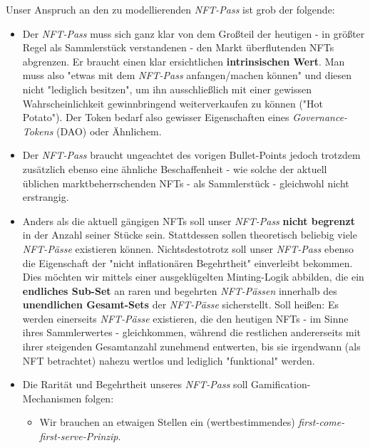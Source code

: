
Unser Anspruch an den zu modellierenden \textit{NFT-Pass} ist grob der folgende:

\vspace{0.2cm}

\begin{itemize}
  \item Der \textit{NFT-Pass} muss sich ganz klar von dem Großteil der heutigen - in größter Regel als Sammlerstück verstandenen - den Markt überflutenden NFTs abgrenzen. Er braucht einen klar ersichtlichen \textbf{intrinsischen Wert}. Man muss also "etwas mit dem \textit{NFT-Pass} anfangen/machen können" und diesen nicht "lediglich besitzen", um ihn ausschließlich mit einer gewissen Wahrscheinlichkeit gewinnbringend weiterverkaufen zu können ("Hot Potato"). Der Token bedarf also gewisser Eigenschaften eines \textit{Governance-Tokens} (DAO) oder Ähnlichem.
  \item 
  \begin{sloppypar}  
  Der \textit{NFT-Pass} braucht ungeachtet des vorigen Bullet-Points jedoch trotzdem zusätzlich ebenso eine ähnliche Beschaffenheit - wie solche der aktuell üblichen marktbeherrschenden NFTs - als Sammlerstück - gleichwohl nicht erstrangig. 
  \end{sloppypar}
  \item Anders als die aktuell gängigen NFTs soll unser \textit{NFT-Pass} \textbf{nicht begrenzt} in der Anzahl seiner Stücke sein. Stattdessen sollen theoretisch beliebig viele \textit{NFT-Pässe} existieren können. Nichtsdestotrotz soll unser \textit{NFT-Pass} ebenso die Eigenschaft der "nicht inflationären Begehrtheit" einverleibt bekommen. Dies möchten wir mittels einer ausgeklügelten Minting-Logik abbilden, die ein \textbf{endliches Sub-Set} an raren und begehrten \textit{NFT-Pässen} innerhalb des \textbf{unendlichen Gesamt-Sets} der \textit{NFT-Pässe} sicherstellt. Soll heißen: Es werden einerseits \textit{NFT-Pässe} exis\-tieren, die den heutigen NFTs - im Sinne ihres Sammlerwertes - gleichkommen, während die restlichen andererseits mit ihrer steigenden Gesamtanzahl zunehmend entwerten, bis sie irgendwann (als NFT betrachtet) nahezu wertlos und lediglich "funktional" werden.
  \item Die Rarität und Begehrtheit unseres \textit{NFT-Pass} soll Gamification-Mechanismen folgen:
  \begin{itemize}
    \item Wir brauchen an etwaigen Stellen ein (wertbestimmendes) \textit{first-come-first-serve-Prinzip}.

\end{itemize}
\end{itemize}
